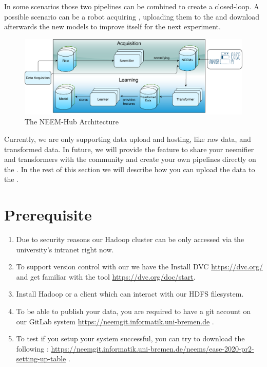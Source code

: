 In some scenarios those two pipelines can be combined to create a closed-loop. 
A possible scenario can be a robot acquiring \neems, uploading them to the \neemhub and download afterwards the new models to improve itself for the next experiment. 


\begin{figure}[h!]
	\centering
	\includegraphics[width=\linewidth]{img/NEEM-Hub.pdf}
	\caption{The NEEM-Hub Architecture}
	\label{fig:neem-hub}
\end{figure} 


Currently, we are only supporting data upload and hosting, like raw data, \neems and transformed data.
In future, we will provide the feature to share your neemifier and transformers with the community and create your own pipelines directly on the \neemhub.
In the rest of this section we will describe how you can upload the data to the \neemhub.

\section{Prerequisite}
\begin{enumerate}
	\item Due to security reasons our Hadoop cluster can be only accessed via the university's intranet right now.	
	\item To support version control with our \neems we have the Install DVC \url{https://dvc.org/} and get familiar with the tool \url{https://dvc.org/doc/start}.
	\item Install Hadoop or a client which can interact with our HDFS filesystem. 
	\item To be able to publish your data, you are required to have a git account on our GitLab system
	\url{https://neemgit.informatik.uni-bremen.de} .
	\item To test if you setup your system successful, you can try to download the following \neems : \url{https://neemgit.informatik.uni-bremen.de/neems/ease-2020-pr2-setting-up-table} .
\end{enumerate}


